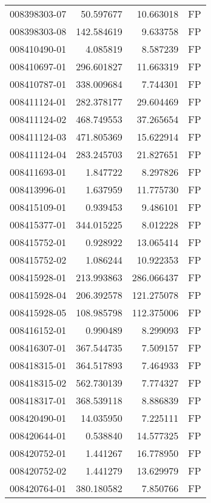 \begin{tabular}{lrrl}
008398303-07 &   50.597677 &      10.663018 &   FP \\
008398303-08 &  142.584619 &       9.633758 &   FP \\
008410490-01 &    4.085819 &       8.587239 &   FP \\
008410697-01 &  296.601827 &      11.663319 &   FP \\
008410787-01 &  338.009684 &       7.744301 &   FP \\
008411124-01 &  282.378177 &      29.604469 &   FP \\
008411124-02 &  468.749553 &      37.265654 &   FP \\
008411124-03 &  471.805369 &      15.622914 &   FP \\
008411124-04 &  283.245703 &      21.827651 &   FP \\
008411693-01 &    1.847722 &       8.297826 &   FP \\
008413996-01 &    1.637959 &      11.775730 &   FP \\
008415109-01 &    0.939453 &       9.486101 &   FP \\
008415377-01 &  344.015225 &       8.012228 &   FP \\
008415752-01 &    0.928922 &      13.065414 &   FP \\
008415752-02 &    1.086244 &      10.922353 &   FP \\
008415928-01 &  213.993863 &     286.066437 &   FP \\
008415928-04 &  206.392578 &     121.275078 &   FP \\
008415928-05 &  108.985798 &     112.375006 &   FP \\
008416152-01 &    0.990489 &       8.299093 &   FP \\
008416307-01 &  367.544735 &       7.509157 &   FP \\
008418315-01 &  364.517893 &       7.464933 &   FP \\
008418315-02 &  562.730139 &       7.774327 &   FP \\
008418317-01 &  368.539118 &       8.886839 &   FP \\
008420490-01 &   14.035950 &       7.225111 &   FP \\
008420644-01 &    0.538840 &      14.577325 &   FP \\
008420752-01 &    1.441267 &      16.778950 &   FP \\
008420752-02 &    1.441279 &      13.629979 &   FP \\
008420764-01 &  380.180582 &       7.850766 &   FP \\

\end{tabular}
